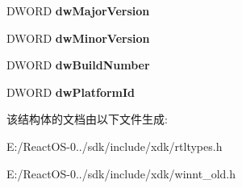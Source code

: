 \begin{DoxyCompactItemize}
D\+W\+O\+RD {\bfseries dw\+Major\+Version}
\item 
\mbox{\label{struct___o_s_v_e_r_s_i_o_n_i_n_f_o_w_ad914aaef5b2d4e17131c3a3893a6de49}} 
D\+W\+O\+RD {\bfseries dw\+Minor\+Version}
\item 
\mbox{\label{struct___o_s_v_e_r_s_i_o_n_i_n_f_o_w_ad7d5f80685fe74caf5b70b9684be0a7f}} 
D\+W\+O\+RD {\bfseries dw\+Build\+Number}
\item 
\mbox{\label{struct___o_s_v_e_r_s_i_o_n_i_n_f_o_w_adb25490eaf3c0d149a26debda4686af1}} 
D\+W\+O\+RD {\bfseries dw\+Platform\+Id}
\end{DoxyCompactItemize}


该结构体的文档由以下文件生成\+:\begin{DoxyCompactItemize}
\item 
E\+:/\+React\+O\+S-\/0../sdk/include/xdk/rtltypes.\+h\item 
E\+:/\+React\+O\+S-\/0../sdk/include/xdk/winnt\+\_\+old.\+h\end{DoxyCompactItemize}
